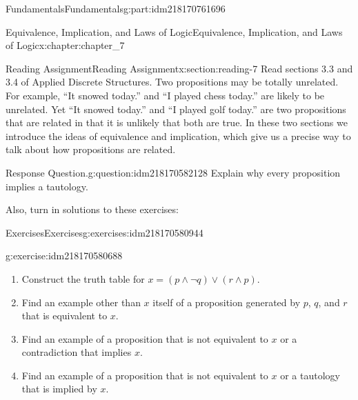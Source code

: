 \documentclass[oneside,10pt,]{book}
\numberwithin{equation}{section}
\begin{document}
\begin{partptx}{Fundamentals}{}{Fundamentals}{}{}{g:part:idm218170761696}
\typeout{************************************************}
%
\begin{chapterptx}{Equivalence, Implication, and Laws of Logic}{}{Equivalence, Implication, and Laws of Logic}{}{}{x:chapter:chapter_7}
%
%
%
%
%
\typeout{************************************************}
\typeout{************************************************}
%
\begin{sectionptx}{Reading Assignment}{}{Reading Assignment}{}{}{x:section:reading-7}
Read sections 3.3 and 3.4 of Applied Discrete Structures. Two propositions may be totally unrelated.  For example, ``It snowed today.'' and ``I played chess today.'' are likely to be unrelated.  Yet ``It snowed today.'' and ``I played golf today.'' are two propositions that are related in that it is unlikely that both are true.  In these two sections we introduce the ideas of equivalence and implication, which give us a precise way to talk about how propositions are related.%
\begin{question}{Response Question.}{g:question:idm218170582128}%
Explain why every proposition implies a tautology.%
\end{question}
Also, turn in solutions to these exercises:%
%
%
\typeout{************************************************}
\typeout{************************************************}
%
\begin{exercises-subsection-numberless}{Exercises}{}{Exercises}{}{}{g:exercises:idm218170580944}
\par\medskip\noindent%
%
\begin{exercisegroup}
\begin{divisionexerciseeg}{1}{}{}{g:exercise:idm218170580688}%
%
\begin{enumerate}[label=(\alph*)]
\item{}Construct the truth table for \(x= (p \land  \neg q) \lor  (r \land  p)\).%
\item{}Find an example other than \(x\) itself of a proposition generated by \(p\), \(q\), and \(r\) that is equivalent to \(x\).%
\item{}Find an example of a proposition that is not equivalent to \(x\) or a contradiction  that implies \(x\).%
\item{}Find an example of a proposition that is not equivalent to \(x\) or a tautology that is implied by \(x\).%
\end{enumerate}

\end{divisionexerciseeg}
\end{exercisegroup}
\end{exercises-subsection-numberless}
\end{sectionptx}
\end{chapterptx}
\end{partptx}
\end{document}
